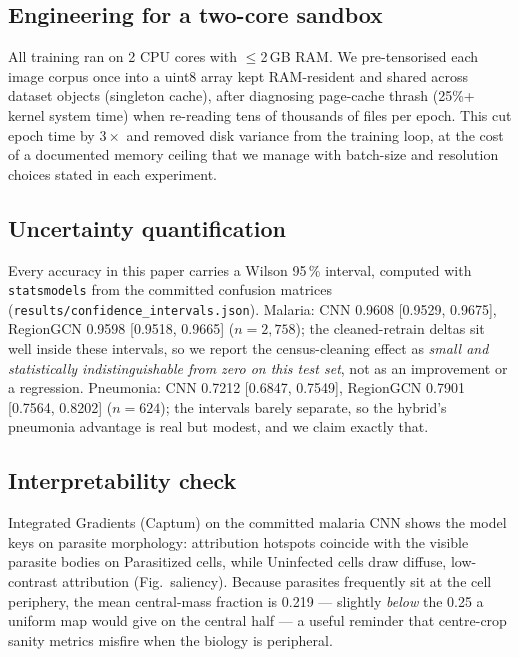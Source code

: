 \documentclass[11pt]{article}
\theoremstyle{definition}
\begin{document}
\subsection{Engineering for a two-core sandbox}
All training ran on 2 CPU cores with $\leq$2\,GB RAM. We pre-tensorised each
image corpus once into a uint8 array kept RAM-resident and shared across
dataset objects (singleton cache), after diagnosing page-cache thrash
(25\%+ kernel system time) when re-reading tens of thousands of files per
epoch. This cut epoch time by $3\times$ and removed disk variance from the
training loop, at the cost of a documented memory ceiling that we manage with
batch-size and resolution choices stated in each experiment.
\subsection{Uncertainty quantification}
Every accuracy in this paper carries a Wilson 95\,\% interval, computed
with \texttt{statsmodels} from the committed confusion matrices
(\texttt{results/confidence\_intervals.json}). Malaria: CNN
0.9608 [0.9529, 0.9675], RegionGCN 0.9598 [0.9518, 0.9665] ($n{=}2{,}758$);
the cleaned-retrain deltas sit well inside these intervals, so we report
the census-cleaning effect as \emph{small and statistically
indistinguishable from zero on this test set}, not as an improvement or a
regression. Pneumonia: CNN 0.7212 [0.6847, 0.7549], RegionGCN 0.7901
[0.7564, 0.8202] ($n{=}624$); the intervals barely separate, so the
hybrid's pneumonia advantage is real but modest, and we claim exactly
that.
\subsection{Interpretability check}
Integrated Gradients (Captum) on the committed malaria CNN shows the
model keys on parasite morphology: attribution hotspots coincide with
the visible parasite bodies on Parasitized cells, while Uninfected
cells draw diffuse, low-contrast attribution (Fig.~saliency). Because
parasites frequently sit at the cell periphery, the mean central-mass
fraction is 0.219 --- slightly \emph{below} the 0.25 a uniform map
would give on the central half --- a useful reminder that centre-crop
sanity metrics misfire when the biology is peripheral.
\end{document}
